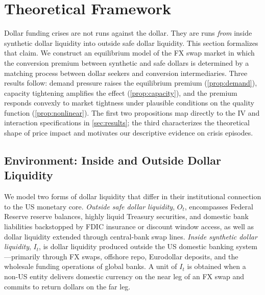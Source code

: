 
\section{Theoretical Framework}
\label{sec:theory}

Dollar funding crises are not runs against the dollar. They are runs \emph{from}
inside synthetic dollar liquidity into outside safe dollar liquidity. This section
formalizes that claim. We construct an equilibrium model of the FX swap market
in which the conversion premium between synthetic and safe dollars is determined
by a matching process between dollar seekers and conversion intermediaries. Three
results follow: demand pressure raises the equilibrium premium (\cref{prop:demand}),
capacity tightening amplifies the effect (\cref{prop:capacity}), and the premium
responds convexly to market tightness under plausible conditions on the quality
function (\cref{prop:nonlinear}). The first two propositions map directly to the IV and
interaction specifications in \cref{sec:results}; the third characterizes the
theoretical shape of price impact and motivates our descriptive evidence on
crisis episodes.


\subsection{Environment: Inside and Outside Dollar Liquidity}
\label{subsec:environment}

We model two forms of dollar liquidity that differ in their institutional
connection to the US monetary core. \emph{Outside safe dollar liquidity}, $O_t$,
encompasses Federal Reserve reserve balances, highly liquid Treasury securities,
and domestic bank liabilities backstopped by FDIC insurance or discount window
access, as well as dollar liquidity extended through central-bank swap lines.
\emph{Inside synthetic dollar liquidity}, $I_t$, is dollar liquidity produced
outside the US domestic banking system---primarily through FX swaps, offshore
repo, Eurodollar deposits, and the wholesale funding operations of global banks.
A unit of $I_t$ is obtained when a non-US entity delivers domestic currency on
the near leg of an FX swap and commits to return dollars on the far leg.

